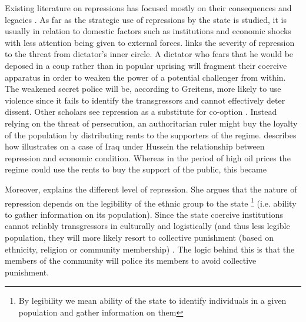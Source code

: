 Existing literature on repressions has focused mostly on their consequences and legacies \citep{rozenas_political_2017, lupu_legacy_2017, zhukov_stalins_2018}. As far as the strategic use of repressions by the state is studied, it is usually in relation to domestic factors such as institutions and economic shocks \citep{davenport_state_2007-1, svolik_politics_2012, greitens_dictators_2016, blaydes_state_2018} with less attention being given to external forces.
\citet{greitens_dictators_2016} links the severity of repression to the threat from dictator's inner circle. A dictator who fears that he would be deposed in a coup rather than in popular uprising will fragment their coercive apparatus in order to weaken the power of a potential challenger from within. The weakened secret police will be, according to Greitens, more likely to use violence since it fails to identify the transgressors and cannot effectively deter dissent. 
Other scholars see repression as a substitute for co-option \citep{wintrobe_political_1998}. Instead relying on the threat of persecution, an authoritarian ruler might buy the loyalty of the population by distributing rents to the supporters of the regime. 
\citet{blaydes_state_2018} describes how 
illustrates on a case of Iraq under Hussein the relationship between repression and economic condition. Whereas in the period of high oil prices the regime could use the rents to buy the support of the public, this became 

Moreover, \citet{blaydes_state_2018} explains the different level of repression. She argues that the nature of repression  depends on the legibility of the ethnic group to the state \footnote{By legibility we mean ability of the state to identify individuals in a given population and gather information on them}
(i.e. ability to gather information on its population). Since the state coercive institutions cannot reliably transgressors in  culturally and logistically (and thus less legible population, they will more likely resort to collective punishment (based on ethnicity, religion or community membership) . The logic behind this is that the members of the community will police its members to avoid collective punishment. 

